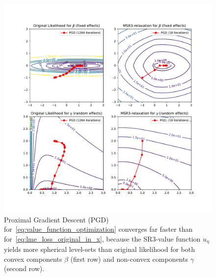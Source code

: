 



\begin{figure}[t]
    \centering
    \includegraphics[width=\textwidth]{figures/intuition_current.pdf}
    \caption{Proximal Gradient Descent (PGD) for~\eqref{eq:value_function_optimization} converges far faster than for~\eqref{eq:lme_loss_original_in_x}, because the SR3-value function $u_\eta$ yields more spherical level-sets than original likelihood for both convex components $\beta$ (first row) and non-convex components $\gamma$ (second row). 
    }
    \label{fig:geometric_intuition_sr3}
\end{figure}

